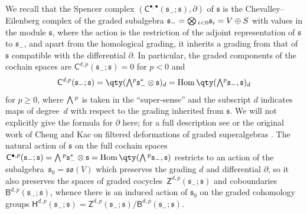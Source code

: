 \documentclass[10pt,a4paper]{amsart}
\numberwithin{equation}{section}
\newcommand{\fs}{\mathfrak{s}}
\newcommand{\fso}{\mathfrak{so}}
\newcommand{\ssB}{\mathsf{B}}
\newcommand{\ssC}{\mathsf{C}}
\newcommand{\ssH}{\mathsf{H}}
\newcommand{\ssZ}{\mathsf{Z}}
\newcommand{\Wedge}{\mathchoice{{\textstyle\bigwedge}}{\bigwedge}{\bigwedge}{\bigwedge}}	%
\newcommand{\Otimes}{\mathchoice{{\textstyle\bigotimes}}{\bigotimes}{\bigotimes}{\bigotimes}}
\newcommand{\1}{\mathbbm{1}}
\DeclareMathOperator{\Hom}{Hom}
\begin{document}
We recall that the Spencer complex $(\ssC^{\bullet,\bullet}(\fs_-;\fs),\partial)$ of $\fs$ is the Chevalley--Eilenberg complex of the graded subalgebra $\fs_-=\Otimes_{i<0}\fs_i=V\oplus S$ with values in the module $\fs$, where the action is the restriction of the adjoint representation of $\fs$ to $\fs_-$, and apart from the homological grading, it inherits a grading from that of $\fs$ compatible with the differential $\partial$. In particular, the graded components of the cochain spaces are $\ssC^{d,p}(\fs_-;\fs)=0$ for $p<0$ and
\[
	\ssC^{d,p}(\fs_-;\fs) = \qty(\Wedge^p \fs_-^*\otimes \fs)_d = \Hom\qty(\Wedge^p \fs_-,\fs)_d
\]
for $p\geq 0$, where $\Wedge^p$ is taken in the ``super-sense'' and the subscript $d$ indicates maps of degree~$d$ with respect to the grading inherited from $\fs$. We will not explicitly give the formula for $\partial$ here; for a full description see \cite[Section~2.2]{Beckett2024_2} or the original work of Cheng and Kac on filtered deformations of graded superalgebras \cite{Cheng1998}. The natural action of $\fs$ on the full cochain spaces~$\ssC^{\bullet,p}(\fs_-;\fs) = \Wedge^p \fs_-^*\otimes \fs = \Hom\qty(\Wedge^p \fs_-,\fs)$ restricts to an action of the subalgebra~$\fs_0=\fso(V)$ which preserves the grading $d$ and differential $\partial$, so it also preserves the spaces of graded cocycles~$\ssZ^{d,p}(\fs_-;\fs)$ and coboundaries $\ssB^{d,p}(\fs_-;\fs)$, whence there is an induced action of $\fs_0$ on the graded cohomology groups $\ssH^{d,p}(\fs_-;\fs)=\ssZ^{d,p}(\fs_-;\fs)/\ssB^{d,p}(\fs_-;\fs)$.
\end{document}
